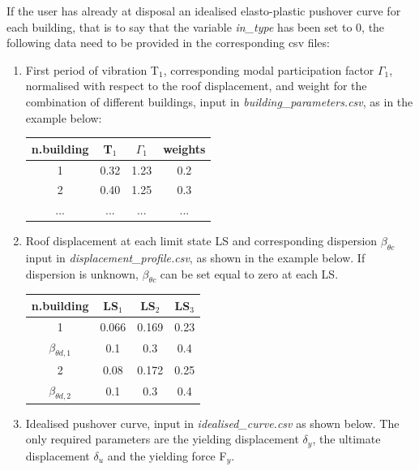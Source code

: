 If the user has already at disposal an idealised elasto-plastic pushover curve for each building, that is to say that the variable \textit{in\_type} has been set to 0, the following data need to be provided in the corresponding csv files:

\begin{enumerate}
\item First period of vibration T$_1$, corresponding modal participation factor $\Gamma_1$, normalised with respect to the roof displacement, and weight for the combination of different buildings, input in \textit{building\_parameters.csv}, as in the example below:
	\begin{table}[H]
	\centering
	\begin{tabular}{|c|c|c|c|} \hline
	\textbf{n.building} & \textbf{T$_1$} & \textbf{$\Gamma_1$} & \textbf{weights}\\ \hline
	1 & 0.32 & 1.23 & 0.2\\ \hline
	2 & 0.40 & 1.25 & 0.3\\ \hline
	... & ... & ... & ... \\ \hline
	\end{tabular}
	\end{table}
	
\item Roof displacement at each limit state LS and corresponding dispersion $\beta_{\theta c}$ input in \textit{displacement\_profile.csv}, as shown in the example below. If dispersion is unknown, $\beta_{\theta c}$ can be set equal to zero at each LS.
	\begin{table}[H]
	\centering
	\begin{tabular}{|c|c|c|c|} \hline
	\textbf{n.building} & \textbf{LS$_1$} &	\textbf{LS$_2$} &	\textbf{LS$_3$} \\ \hline
	1 & 0.066 & 0.169 & 0.23\\ \hline
	$\beta_{\theta d, 1}$ & 0.1 & 0.3 & 0.4\\ \hline
	2 & 0.08 & 0.172 & 0.25\\ \hline
	$\beta_{\theta d, 2}$ & 0.1 & 0.3 & 0.4\\ \hline	
	\end{tabular}
	\end{table}
	
\item Idealised pushover curve, input in \textit{idealised\_curve.csv} as shown below. The only required parameters are the yielding displacement $\delta_y$, the ultimate displacement $\delta_u$ and the yielding force F$_y$.


\end{enumerate}
